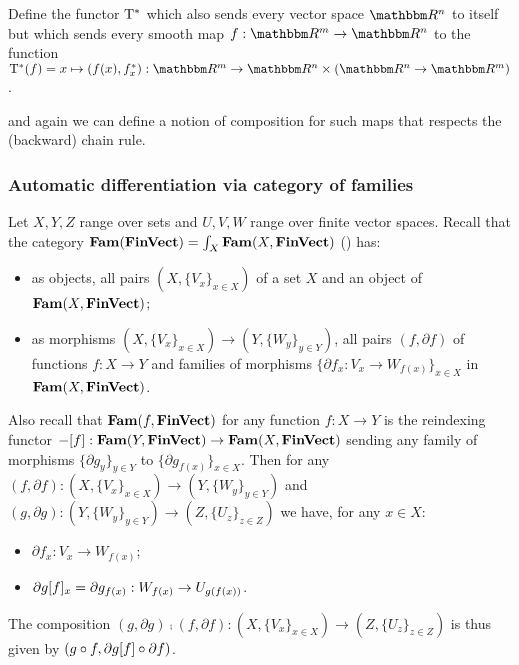 \begin{definition}
Define the functor $\mathrm{T}^*$ which also sends every vector space $\RR^n$ to itself but which sends every
smooth map $f: \RR^m \to \RR^n$ to the function $\tangents^*(f) = x \mapsto (f(x), \pullf{f}_x): \RR^m \to
\RR^n \times (\RR^n \to \RR^m)$.
\end{definition}

\noindent and again we can define a notion of composition for such maps that respects the (backward) chain
rule.

\subsubsection{Automatic differentiation via category of families}

Let $X, Y, Z$ range over sets and $U, V, W$ range over finite vector spaces. Recall that the category
$\mathbf{Fam}(\mathbf{FinVect}) = \int_{X}\mathbf{Fam}(X, \mathbf{FinVect})$ () has:
\begin{itemize}
\item as objects, all pairs $(X, \{V_x\}_{x \in X})$ of a set $X$ and an object of $\mathbf{Fam}(X,\mathbf{FinVect})$;
\item as morphisms $(X, \{V_x\}_{x \in X}) \to (Y, \{W_y\}_{y \in Y})$, all pairs $(f, \partial f)$ of
functions $f: X \to Y$ and families of morphisms $\{\partial f_x: V_x \to W_{f(x)}\}_{x \in X}$
in $\mathbf{Fam}(X,\mathbf{FinVect})$.
\end{itemize}

Also recall that $\mathbf{Fam}(f, \mathbf{FinVect})$ for any function $f: X \to Y$ is the reindexing functor $-[f]:
\mathbf{Fam}(Y, \mathbf{FinVect}) \to \mathbf{Fam}(X, \mathbf{FinVect})$ sending any family of morphisms $\{\partial g_y\}_{y \in Y}$ to
$\{\partial g_{f(x)}\}_{x \in X}$. Then for any $(f, \partial f): (X, \{V_x\}_{x \in X}) \to (Y, \{W_y\}_{y
\in Y})$ and $(g, \partial g): (Y, \{W_y\}_{y \in Y}) \to (Z, \{U_z\}_{z \in Z})$ we have, for any $x \in X$:
\begin{itemize}
\item $\partial f_x: V_x \to W_{f(x)}$;
\item $\partial g[f]_x = \partial g_{f(x)}: W_{f(x)} \to U_{g(f(x))}$.
\end{itemize}

\noindent The composition $(g, \partial g) \comp (f, \partial f): (X, \{V_x\}_{x \in X}) \to (Z, \{U_z\}_{z
\in Z})$ is thus given by $(g \circ f, \partial g[f] \circ \partial f)$.
